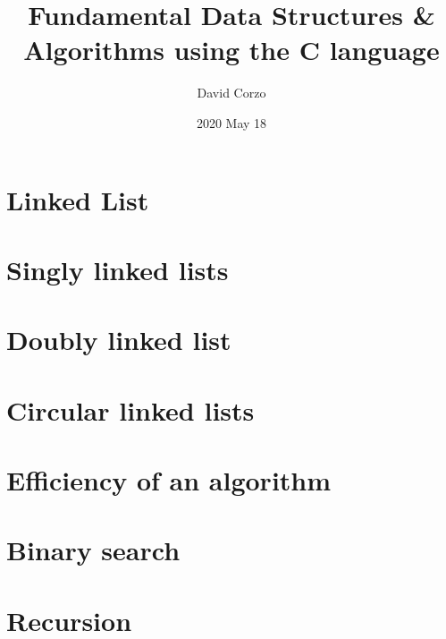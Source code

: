 \documentclass[openany]{book}
\title{\Huge Fundamental Data Structures \& Algorithms using the C language}
\date{2020 May 18} %
\author{David Corzo}
\begin{document}
\maketitle 
\tableofcontents

% 

% 

% 

% 

\chapter{Linked List}


\chapter{Singly linked lists}


\chapter{Doubly linked list}


\chapter{Circular linked lists}


\chapter{Efficiency of an algorithm}


\chapter{Binary search}


\chapter{Recursion}


\end{document}
